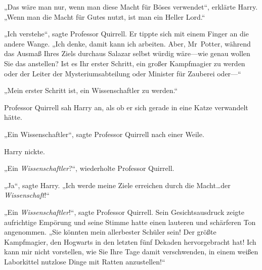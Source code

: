 „Das wäre man nur, wenn man diese Macht für Böses verwendet“, erklärte Harry. „Wenn man die Macht für Gutes nutzt, ist man ein Heller Lord.“

„Ich verstehe“, sagte Professor Quirrell. Er tippte sich mit einem Finger an die andere Wange. „Ich denke, damit kann ich arbeiten. Aber, Mr~Potter, während das Ausmaß Ihres Ziels durchaus Salazar selbst würdig wäre—wie genau wollen Sie das anstellen? Ist es Ihr erster Schritt, ein großer Kampfmagier zu werden oder der Leiter der Mysteriumsabteilung oder Minister für Zauberei oder—“

„Mein erster Schritt ist, ein Wissenschaftler zu werden.“

Professor Quirrell sah Harry an, als ob er sich gerade in eine Katze verwandelt hätte.

„Ein Wissenschaftler“, sagte Professor Quirrell nach einer Weile.

Harry nickte.

„Ein \emph{Wissenschaftler}?“, wiederholte Professor Quirrell.

„Ja“, sagte Harry. „Ich werde meine Ziele erreichen durch die Macht…der \emph{Wissenschaft}!“

„Ein \emph{Wissenschaftler}!“, sagte Professor Quirrell. Sein Gesichtsausdruck zeigte aufrichtige Empörung und seine Stimme hatte einen lauteren und schärferen Ton angenommen. „Sie könnten mein allerbester Schüler sein! Der größte Kampfmagier, den Hogwarts in den letzten fünf Dekaden hervorgebracht hat! Ich kann mir nicht vorstellen, wie Sie Ihre Tage damit verschwenden, in einem weißen Laborkittel nutzlose Dinge mit Ratten anzustellen!“

